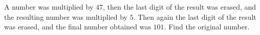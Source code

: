 A number was multiplied by $47$, then the last digit of the result was erased, and the resulting number was multiplied by $5$. Then again the last digit of the result was erased, and the final number obtained was $101$. Find the original number.
